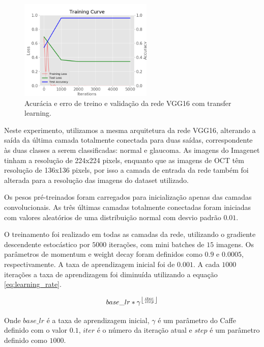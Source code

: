 \documentclass[conference]{IEEEtran}
\DeclarePairedDelimiter\floor{\lfloor}{\rfloor}
\begin{document}

  \begin{figure}[!tp]
    \centering
    \includegraphics[width=2.5in]{img/curve_vgg16.png}
    \caption{Acurácia e erro de treino e validação da rede VGG16 com transfer learning.}
    \label{fig:acuracia_vgg16_transfer}
  \end{figure}


  Neste experimento, utilizamos a mesma arquitetura da rede VGG16, alterando a saída da última camada totalmente conectada para duas saídas, correspondente às duas classes a serem classificadas: normal e glaucoma. As imagens do Imagenet tinham a resolução de 224x224 pixels, enquanto que as imagens de OCT têm resolução de 136x136 pixels, por isso a camada de entrada da rede também foi alterada para a resolução das imagens do dataset utilizado.
  
  Os pesos pré-treinados foram carregados para inicialização apenas das camadas convolucionais. As três últimas camadas totalmente conectadas foram iniciadas com valores aleatórios de uma distribuição normal com desvio padrão $0.01$.

  O treinamento foi realizado em todas as camadas da rede, utilizando o gradiente descendente estocástico por $5000$ iterações, com mini batches de $15$ imagens. Os parâmetros de momentum e weight decay foram definidos como $0.9$ e $0.0005$, respectivamente. A taxa de aprendizagem inicial foi de $0.001$. A cada $1000$ iterações a taxa de aprendizagem foi diminuída utilizando a equação \ref{eq:learning_rate}.

  \begin{equation}
    base\_lr * \gamma^{\floor*{\frac{iter}{step}}}
    \label{eq:learning_rate}
  \end{equation}

  Onde $base\_lr$ é a taxa de aprendizagem inicial, $\gamma$ é um parâmetro do Caffe definido com o valor $0.1$, $iter$ é o número da iteração atual e $step$ é um parâmetro definido como $1000$.
\end{document}
